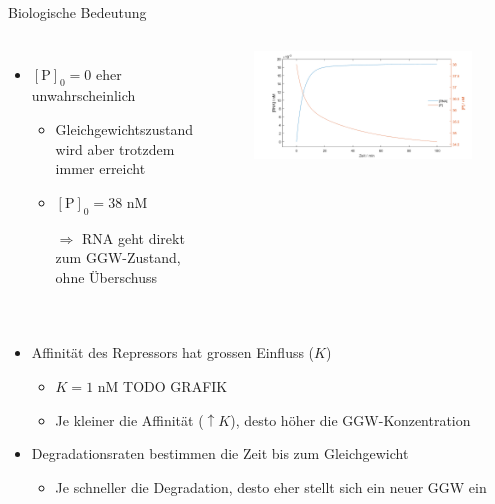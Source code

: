 \documentclass[11pt,aspectratio=169,reqno]{beamer}
\begin{document}
\begin{frame}{Biologische Bedeutung}
    \begin{columns}
        \begin{itemize}
            \item $[\text{P}]_0=0$ eher unwahrscheinlich
            \begin{itemize}
                \item Gleichgewichtszustand wird aber trotzdem immer erreicht
                \item $[\text{P}]_0=38\text{ nM}$
                \item[$\Rightarrow$] RNA geht direkt zum GGW-Zustand, ohne Überschuss
            \end{itemize}
        \end{itemize}
        
        \begin{figure}
            \centering
            \includegraphics[width=\linewidth]{images/negative_autoregulation_high_protein.m.png}
        \end{figure}
    \end{columns}

    \begin{columns}
        \begin{itemize}
            \item Affinität des Repressors hat grossen Einfluss ($K$)
            \begin{itemize}
                \item $K=1\text{ nM}$ TODO GRAFIK
                \item Je kleiner die Affinität ($\uparrow K$), desto höher die GGW-Konzentration
            \end{itemize}
            \item Degradationsraten bestimmen die Zeit bis zum Gleichgewicht
            \begin{itemize}
                \item Je schneller die Degradation, desto eher stellt sich ein neuer GGW ein
            \end{itemize}
        \end{itemize}


\end{columns}
\end{frame}
\end{document}
